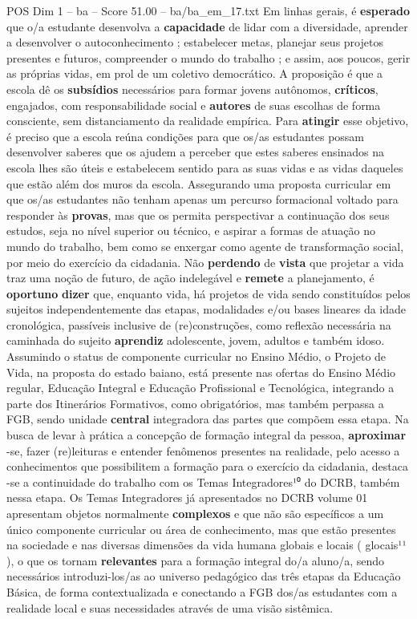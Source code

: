 \begin{textsample}{POS Dim 1 – ba – Score 51.00 – ba/ba\_em\_17.txt}
Em linhas gerais, é \textbf{esperado} que o/a estudante desenvolva a \textbf{capacidade} de lidar com a diversidade, aprender a desenvolver o autoconhecimento ; estabelecer metas, planejar seus projetos presentes e futuros, compreender o mundo do trabalho ; e assim, aos poucos, gerir as próprias vidas, em prol de um coletivo democrático.
A proposição é que a escola dê os \textbf{subsídios} necessários para formar jovens autônomos, \textbf{críticos}, engajados, com responsabilidade social e \textbf{autores} de suas escolhas de forma consciente, sem distanciamento da realidade empírica.
Para \textbf{atingir} esse objetivo, é preciso que a escola reúna condições para que os/as estudantes possam desenvolver saberes que os ajudem a perceber que estes saberes ensinados na escola lhes são úteis e estabelecem sentido para as suas vidas e as vidas daqueles que estão além dos muros da escola.
Assegurando uma proposta curricular em que os/as estudantes não tenham apenas um percurso formacional voltado para responder às \textbf{provas}, mas que os permita perspectivar a continuação dos seus estudos, seja no nível superior ou técnico, e aspirar a formas de atuação no mundo do trabalho, bem como se enxergar como agente de transformação social, por meio do exercício da cidadania.
Não \textbf{perdendo} de \textbf{vista} que projetar a vida traz uma noção de futuro, de ação indelegável e \textbf{remete} a planejamento, é \textbf{oportuno} \textbf{dizer} que, enquanto vida, há projetos de vida sendo constituídos pelos sujeitos independentemente das etapas, modalidades e/ou bases lineares da idade cronológica, passíveis inclusive de (re)construções, como reflexão necessária na caminhada do sujeito \textbf{aprendiz} adolescente, jovem, adultos e também idoso.
Assumindo o status de componente curricular no Ensino Médio, o Projeto de Vida, na proposta do estado baiano, está presente nas ofertas do Ensino Médio regular, Educação Integral e Educação Profissional e Tecnológica, integrando a parte dos Itinerários Formativos, como obrigatórios, mas também perpassa a FGB, sendo unidade \textbf{central} integradora das partes que compõem essa etapa.
Na busca de levar à prática a concepção de formação integral da pessoa, \textbf{aproximar} -se, fazer (re)leituras e entender fenômenos presentes na realidade, pelo acesso a conhecimentos que possibilitem a formação para o exercício da cidadania, destaca -se a continuidade do trabalho com os Temas Integradores¹⁰ do DCRB, também nessa etapa.
Os Temas Integradores já apresentados no DCRB volume 01 apresentam objetos normalmente \textbf{complexos} e que não são específicos a um único componente curricular ou área de conhecimento, mas que estão presentes na sociedade e nas diversas dimensões da vida humana globais e locais ( glocais¹¹ ), o que os tornam \textbf{relevantes} para a formação integral do/a aluno/a, sendo necessários introduzi-los/as ao universo pedagógico das três etapas da Educação Básica, de forma contextualizada e conectando a FGB dos/as estudantes com a realidade local e suas necessidades através de uma visão sistêmica.

\end{textsample}
